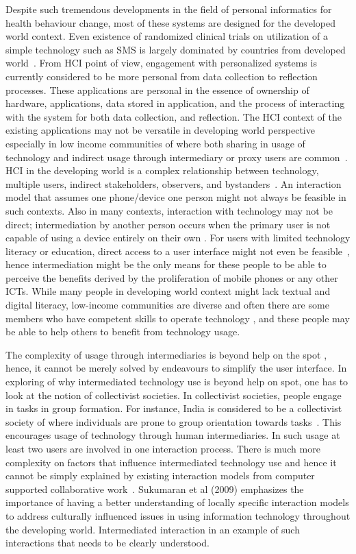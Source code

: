 Despite such tremendous developments in the field of personal informatics for health behaviour change, most of these systems are designed for the developed world context. Even existence of randomized clinical trials on utilization of a simple technology such as SMS is largely dominated by countries from developed world~\citep{cole2010text}. From HCI point of view, engagement with personalized systems is currently considered to be more personal from data collection to reflection processes. These applications are personal in the essence of ownership of hardware, applications, data stored in application, and the process of interacting with the system for both data collection, and reflection. The HCI context of the existing applications may not be versatile in developing world perspective especially in low income communities of where  both sharing in usage of technology and indirect usage through intermediary or proxy users are common~\citep{kaplan2006can,sambasivan2010}. HCI in the developing world is a complex relationship between technology, multiple users, indirect stakeholders, observers, and bystanders~\citep{parikh2006}. An interaction model that assumes one phone/device one person might not always be feasible in such contexts. Also in many contexts, interaction with technology may not be direct; intermediation by another person occurs when the primary user is not capable of using a device entirely on their own \citep{sambasivan2010}. For users with limited technology literacy or education, direct access to a user interface might not even be feasible~\citep{parikh2006}, hence intermediation might be the only means for these people to be able to perceive the benefits derived by the proliferation of mobile phones or any other ICTs. While many people in developing world context might lack textual and digital literacy, low-income communities are diverse and often there are some members who have competent skills to operate technology \citep{sambasivan2010}, and these people may be able to help others to benefit from technology usage.

The complexity of usage through intermediaries is beyond help on the spot \citep{sambasivan2010}, hence, it cannot be merely solved by endeavours to simplify the user interface. In exploring of why intermediated technology use is beyond help on spot, one has to look at the notion of collectivist societies. In collectivist societies, people engage in tasks in group formation. For instance, India is considered to be a collectivist society of where individuals are prone to group orientation towards tasks~\citep{parikh2006}. This encourages usage of technology through human intermediaries. In such usage at least two users are involved in one interaction process. There is much more complexity on factors that influence intermediated technology use and hence it cannot be simply explained by existing interaction models from computer supported collaborative work~\citep{parikh2006}. Sukumaran et al (2009) emphasizes the importance of having a better understanding of locally specific interaction models to address culturally influenced issues in using information technology throughout the developing world. Intermediated interaction in an example of such interactions that needs to be clearly understood.


